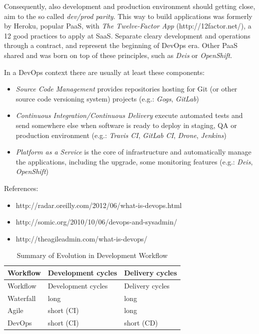 Consequently, also development and production environment should getting
close, aim to the so called \emph{dev/prod parity}. This way to build
applications was formerly by Heroku, popular PaaS, with \emph{The
Twelve-Factor App} (http://12factor.net/), a 12 good practices to apply
at SaaS. Separate cleary development and operations through a contract,
and represent the beginning of DevOps era. Other PaaS shared and was
born on top of these principles, such as \emph{Deis} or
\emph{OpenShift}.

In a DevOps context there are usually at least these components:

\begin{itemize}
\itemsep1pt\parskip0pt
\item
  \emph{Source Code Management} provides repositories hosting for Git
  (or other source code versioning system) projects (e.g.: \emph{Gogs},
  \emph{GitLab})
\item
  \emph{Continuous Integration/Continuous Delivery} execute automated
  tests and send somewhere else when software is ready to deploy in
  staging, QA or production environment (e.g.: \emph{Travis CI},
  \emph{GitLab CI}, \emph{Drone}, \emph{Jenkins})
\item
  \emph{Platform as a Service} is the core of infrastructure and
  automatically manage the applications, including the upgrade, some
  monitoring features (e.g.: \emph{Deis}, \emph{OpenShift})
\end{itemize}

References:

\begin{itemize}
\itemsep1pt\parskip0pt
\item
  http://radar.oreilly.com/2012/06/what-is-devops.html
\item
  http://somic.org/2010/10/06/devops-and-sysadmin/
\item
  http://theagileadmin.com/what-is-devops/
\end{itemize}

\begin{longtable}[c]{@{}lll@{}}
\caption{Summary of Evolution in Development Workflow}\tabularnewline
\toprule
Workflow & Development cycles & Delivery cycles\tabularnewline
\midrule
\endfirsthead
\toprule
Workflow & Development cycles & Delivery cycles\tabularnewline
\midrule
\endhead
Waterfall & long & long\tabularnewline
Agile & short (CI) & long\tabularnewline
DevOps & short (CI) & short (CD)\tabularnewline
\bottomrule
\end{longtable}

